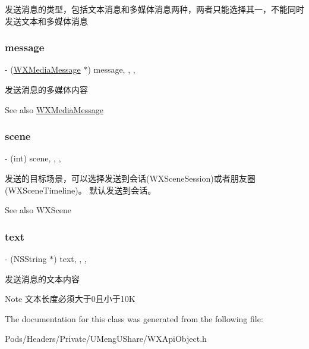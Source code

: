 发送消息的类型，包括文本消息和多媒体消息两种，两者只能选择其一，不能同时发送文本和多媒体消息 \mbox{\label{interface_send_message_to_w_x_req_ab681e833acc946f6ecc42242347a992f}} 
\subsubsection{\texorpdfstring{message}{message}}
{\footnotesize\ttfamily -\/ (\mbox{\hyperlink{interface_w_x_media_message}{W\+X\+Media\+Message}} $\ast$) message\hspace{0.3cm}{\ttfamily [read]}, {\ttfamily [write]}, {\ttfamily [nonatomic]}, {\ttfamily [retain]}}

发送消息的多媒体内容 \begin{DoxySeeAlso}{See also}
\mbox{\hyperlink{interface_w_x_media_message}{W\+X\+Media\+Message}} 
\end{DoxySeeAlso}
\mbox{\label{interface_send_message_to_w_x_req_a40e26a162d0611b30050b20dccf39d14}} 
\subsubsection{\texorpdfstring{scene}{scene}}
{\footnotesize\ttfamily -\/ (int) scene\hspace{0.3cm}{\ttfamily [read]}, {\ttfamily [write]}, {\ttfamily [nonatomic]}, {\ttfamily [assign]}}

发送的目标场景，可以选择发送到会话(\+W\+X\+Scene\+Session)或者朋友圈(\+W\+X\+Scene\+Timeline)。 默认发送到会话。 \begin{DoxySeeAlso}{See also}
W\+X\+Scene 
\end{DoxySeeAlso}
\mbox{\label{interface_send_message_to_w_x_req_a483ee902e3c1f6b1748f886b197f2371}} 
\subsubsection{\texorpdfstring{text}{text}}
{\footnotesize\ttfamily -\/ (N\+S\+String $\ast$) text\hspace{0.3cm}{\ttfamily [read]}, {\ttfamily [write]}, {\ttfamily [nonatomic]}, {\ttfamily [retain]}}

发送消息的文本内容 \begin{DoxyNote}{Note}
文本长度必须大于0且小于10K 
\end{DoxyNote}


The documentation for this class was generated from the following file\+:\begin{DoxyCompactItemize}
\item 
Pods/\+Headers/\+Private/\+U\+Meng\+U\+Share/W\+X\+Api\+Object.\+h\end{DoxyCompactItemize}
